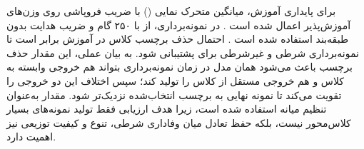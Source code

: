 برای پایداری آموزش، میانگین متحرک نمایی () با ضریب فروپاشی  روی وزن‌های آموزش‌پذیر اعمال شده است \cite{Polyak1992EMA,ho2020ddpm}. در نمونه‌برداری، از  با ۲۵۰ گام و ضریب هدایت بدون طبقه‌بند  استفاده شده است \cite{ho2020ddpm,ho2022classifierFreeGuidance}. احتمال حذف برچسب کلاس در آموزش برابر  است تا نمونه‌برداری شرطی و غیرشرطی برای  پشتیبانی شود. به بیان عملی، این مقدار حذف برچسب باعث می‌شود همان مدل در زمان نمونه‌برداری بتواند هم خروجی وابسته به کلاس و هم خروجی مستقل از کلاس را تولید کند؛ سپس  اختلاف این دو خروجی را تقویت می‌کند تا نمونه نهایی به برچسب انتخاب‌شده نزدیک‌تر شود. مقدار  به‌عنوان تنظیم میانه استفاده شده است، زیرا هدف ارزیابی فقط تولید نمونه‌های بسیار کلاس‌محور نیست، بلکه حفظ تعادل میان وفاداری شرطی، تنوع و کیفیت توزیعی نیز اهمیت دارد.

\begin{table}[htbp]
    \centering
    \caption[خلاصه تنظیمات آموزش و نمونه‌برداری]{خلاصه ابرپارامترها و تنظیمات مورد استفاده در آموزش و نمونه‌برداری .}
    \label{tab:hyperparams}
    \begin{latin}
    \end{latin}
\end{table}

